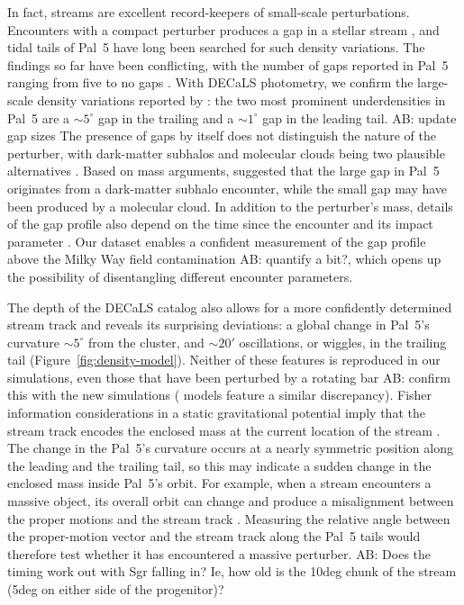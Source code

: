 \documentclass[twocolumn]{aastex62}
\newcommand{\ab}[1]{{\color{teal} AB: #1}}
\begin{document}
In fact, streams are excellent record-keepers of small-scale perturbations.
Encounters with a compact perturber produces a gap in a stellar stream \citep[e.g.,][]{Johnston:2002,Ibata:2002}, and tidal tails of Pal~5 have long been searched for such density variations.
The findings so far have been conflicting, with the number of gaps reported in Pal~5 ranging from five \citep{Carlberg:2012} to no gaps \citep{Ibata:2016}.
With DECaLS photometry, we confirm the large-scale density variations reported by \citet{Erkal:2017}: the two most prominent underdensities in Pal~5 are a $\sim5^\circ$ gap in the trailing and a $\sim1^\circ$ gap in the leading tail. 
\ab{update gap sizes}
The presence of gaps by itself does not distinguish the nature of the perturber, with dark-matter subhalos and molecular clouds being two plausible alternatives \citep[e.g.,][]{Yoon:2011,Amorisco:2016}.
Based on mass arguments, \citet{Erkal:2017} suggested that the large gap in Pal~5 originates from a dark-matter subhalo encounter, while the small gap may have been produced by a molecular cloud.
In addition to the perturber's mass, details of the gap profile also depend on the time since the encounter and its impact parameter \citep{Erkal:2015}.
Our dataset enables a confident measurement of the gap profile above the Milky Way field contamination \ab{quantify a bit?}, which opens up the possibility of disentangling different encounter parameters.

The depth of the DECaLS catalog also allows for a more confidently determined stream track and reveals its surprising deviations: a global change in Pal~5's curvature $\sim5^\circ$ from the cluster, and $\sim20'$ oscillations, or wiggles, in the trailing tail (Figure~\ref{fig:density-model}).
Neither of these features is reproduced in our simulations, even those that have been perturbed by a rotating bar \ab{confirm this with the new simulations} (\citealt{Erkal:2017} models feature a similar discrepancy).
Fisher information considerations in a static gravitational potential imply that the stream track encodes the enclosed mass at the current location of the stream \citep{Bonaca:2018}.
The change in the Pal~5's curvature occurs at a nearly symmetric position along the leading and the trailing tail, so this may indicate a sudden change in the enclosed mass inside Pal~5's orbit.
For example, when a stream encounters a massive object, its overall orbit can change and produce a misalignment between the proper motions and the stream track \citep{Erkal:2018, Koposov:2019}.
Measuring the relative angle between the proper-motion vector and the stream track along the Pal~5 tails would therefore test whether it has encountered a massive perturber.
\ab{Does the timing work out with Sgr falling in? Ie, how old is the 10deg chunk of the stream (5deg on either side of the progenitor)?}
\end{document}
